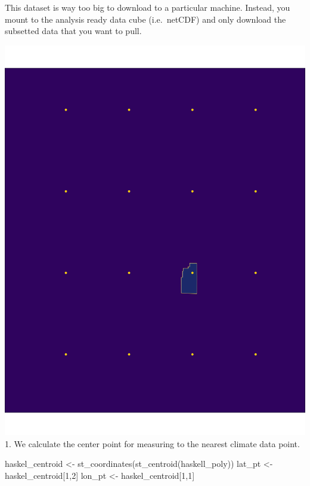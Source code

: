 \documentclass[
  paper=a4,
  ,captions=tableheading
]{scrartcl}
\newenvironment{Shaded}{\begin{snugshade}}{\end{snugshade}}
\newcommand{\DecValTok}[1]{\textcolor[rgb]{0.00,0.00,0.81}{#1}}
\newcommand{\FunctionTok}[1]{\textcolor[rgb]{0.00,0.00,0.00}{#1}}
\newcommand{\NormalTok}[1]{#1}
\newcommand{\OtherTok}[1]{\textcolor[rgb]{0.56,0.35,0.01}{#1}}
\begin{document}
This dataset is way too big to download to a particular machine.
Instead, you mount to the analysis ready data cube (i.e.~netCDF) and
only download the subsetted data that you want to pull.

\includegraphics{climate_grid.png} 1. We calculate the center point for
measuring to the nearest climate data point.

\begin{Shaded}
\begin{Highlighting}[]
\NormalTok{haskel\_centroid }\OtherTok{\textless{}{-}} \FunctionTok{st\_coordinates}\NormalTok{(}\FunctionTok{st\_centroid}\NormalTok{(haskell\_poly))}
\NormalTok{lat\_pt }\OtherTok{\textless{}{-}}\NormalTok{ haskel\_centroid[}\DecValTok{1}\NormalTok{,}\DecValTok{2}\NormalTok{]}
\NormalTok{lon\_pt }\OtherTok{\textless{}{-}}\NormalTok{ haskel\_centroid[}\DecValTok{1}\NormalTok{,}\DecValTok{1}\NormalTok{]}
\end{Highlighting}
\end{Shaded}
\end{document}
